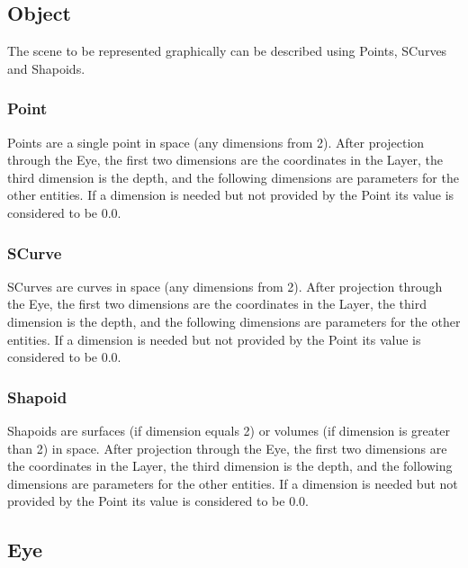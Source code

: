 \subsection{Object}

The scene to be represented graphically can be described using Points, SCurves and Shapoids.\\

\subsubsection{Point}

Points are a single point in space (any dimensions from 2). After projection through the Eye, the first two dimensions are the coordinates in the Layer, the third dimension is the depth, and the following dimensions are parameters for the other entities. If a dimension is needed but not provided by the Point its value is considered to be 0.0.\\

\subsubsection{SCurve}

SCurves are curves in space (any dimensions from 2). After projection through the Eye, the first two dimensions are the coordinates in the Layer, the third dimension is the depth, and the following dimensions are parameters for the other entities. If a dimension is needed but not provided by the Point its value is considered to be 0.0.\\

\subsubsection{Shapoid}

Shapoids are surfaces (if dimension equals 2) or volumes (if dimension is greater than 2) in space. After projection through the Eye, the first two dimensions are the coordinates in the Layer, the third dimension is the depth, and the following dimensions are parameters for the other entities. If a dimension is needed but not provided by the Point its value is considered to be 0.0.\\

\subsection{Eye}

